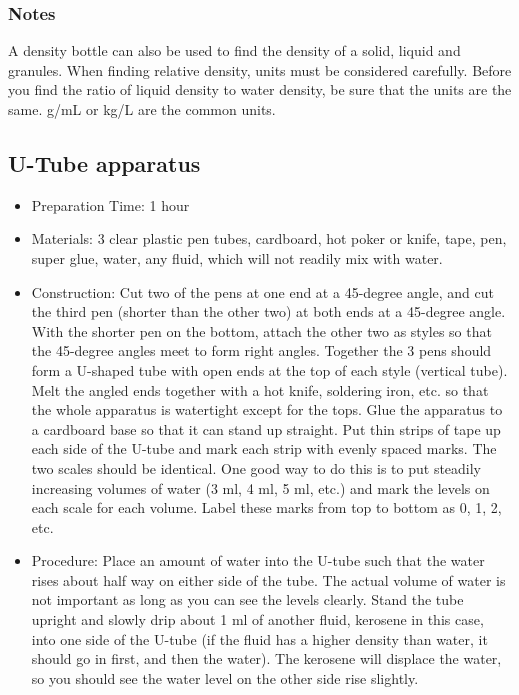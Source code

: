 \subsubsection*{Notes}
A density bottle can also be used to find the density of a solid, liquid and granules.
When finding relative density, units must be considered carefully.  Before you find the ratio of liquid density to water density, be sure that the units are the same.  g/mL or kg/L are the common units.

\subsection{U-Tube apparatus}
\begin{itemize}
\item{Preparation Time: 1 hour}
\item{Materials: 3 clear plastic pen tubes, cardboard, hot poker or knife, tape, pen, super glue, water, any fluid, which will not readily mix with water.}
\item{Construction: Cut two of the pens at one end at a 45-degree angle, and cut the third pen (shorter than the other two) at both ends at a 45-degree angle. With the shorter pen on the bottom, attach the other two as styles so that the 45-degree angles meet to form right angles. Together the 3 pens should form a U-shaped tube with open ends at the top of each style (vertical tube). Melt the angled ends together with a hot knife, soldering iron, etc. so that the whole apparatus is watertight except for the tops. Glue the apparatus to a cardboard base so that it can stand up straight. Put thin strips of tape up each side of the U-tube and mark each strip with evenly spaced marks. The two scales should be identical. One good way to do this is to put steadily increasing volumes of water (3 ml, 4 ml, 5 ml, etc.) and mark the levels on each scale for each volume. Label these marks from top to bottom as 0, 1, 2, etc.}
\item{Procedure: Place an amount of water into the U-tube such that the water rises about half way on either side of the tube. The actual volume of water is not important as long as you can see the levels clearly. Stand the tube upright and slowly drip about 1 ml of another fluid, kerosene in this case, into one side of the U-tube (if the fluid has a higher density than water, it should go in first, and then the water). The kerosene will displace the water, so you should see the water level on the other side rise slightly.\\
}
\end{itemize}
